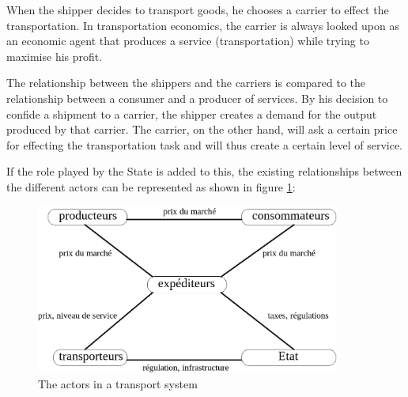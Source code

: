 When the shipper decides to transport goods, he chooses a carrier to effect the
transportation.  In transportation economics, the carrier is always looked upon
as an economic agent that produces a service (transportation) while trying to
maximise his profit.

The relationship between the shippers and the carriers is compared to the
relationship between a consumer and a producer of services.  By his decision to
confide a shipment to a carrier, the shipper creates a demand for the output
produced by that carrier.  The carrier, on the other hand, will ask a certain
price for effecting the transportation task and will thus create a certain level
of service.


If the role played by the State is added to this, the existing relationships
between the different actors can be represented as shown in figure \ref{f2_3}:

\begin{figure}[htbp]
\centerline{\includegraphics[width=10cm]{f2_3.png}}
\caption{\label{f2_3} The actors in a transport system}
\end{figure}



